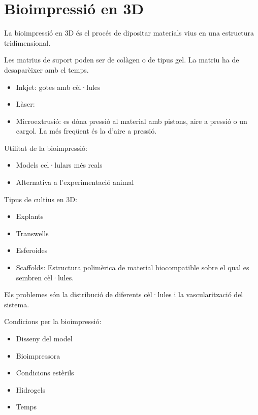 \section{Bioimpressió en 3D}
La bioimpressió en 3D és el procés de dipositar materials vius en una estructura tridimensional.

Les matrius de suport poden ser de colàgen o de tipus gel. La matriu ha de desaparèixer amb el temps.

\begin{itemize}
\item Inkjet: gotes amb cèl·lules
\item Làser: 
\item Microextrusió: es dóna pressió al material amb pistons, aire a pressió o un cargol. La més freqüent és la d'aire a pressió.
\end{itemize}

Utilitat de la bioimpressió:
\begin{itemize}
\item Models cel·lulars més reals
\item Alternativa a l'experimentació animal
\end{itemize}

Tipus de cultius en 3D:
\begin{itemize}
\item Explants
\item Transwells
\item Esferoides
\item Scaffolds: Estructura polimèrica de material biocompatible sobre el qual es sembren cèl·lules.
\end{itemize}

Els problemes són la distribució de diferents cèl·lules i la vascularització del sistema.

Condicions per la bioimpressió:
\begin{itemize}
\item Disseny del model
\item Bioimpressora
\item Condicions estèrils
\item Hidrogels
\item Temps
\end{itemize}


